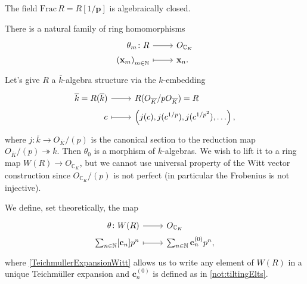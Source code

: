 \begin{thm}
	The field $\mathrm{Frac}\, R = R[1/\mathbf{p}]$ is algebraically closed.
\end{thm}


\begin{rem}[]
	There is a natural family of ring homomorphisms
	\begin{equation*}
	\begin{tikzcd}[row sep = 0ex
		,/tikz/column 1/.append style={anchor=base east}
		,/tikz/column 2/.append style={anchor=base west}]
		\theta_m\colon R \arrow[r, "", rightarrow] &
		O_{\mathbb{C}_K} \\
		\left( \mathbf{x}_m \right)_{m \in \mathbb{N}} \arrow[r, "", mapsto] & 
		\mathbf{x}_n
	.\end{tikzcd}
	\end{equation*} 
	Let's give $R$ a $\overline{k}$-algebra structure
	via the $k$-embedding
	\begin{equation*}
	\begin{tikzcd}[row sep = 0ex
		,/tikz/column 1/.append style={anchor=base east}
		,/tikz/column 2/.append style={anchor=base west}]
		\overline{k} = R(\overline{k}) \arrow[r, "", rightarrow] &
		R(O_{\overline{K}}/pO_{\overline{K}}) =R\\
		c \arrow[r, "", mapsto] & 
		\left( j(c), j(c^{1/p}), j(c^{1/p^2}), \ldots \right)
	,\end{tikzcd}
	\end{equation*} 
	where $j\colon \overline{k} \to O_{\overline{K}}/ (p)$ is the canonical
	section to the reduction map $O_{\overline{K}}/ (p) \twoheadrightarrow \overline{k}$.
	Then $\theta_0$ is a morphism of $\overline{k}$-algebras.
	We wish to lift it to a ring map $W(R) \to O_{\mathbb{C}_K}$,
	but we cannot use universal property of the Witt vector construction
	since $O_{\mathbb{C}_K}/ (p)$ is not perfect (in particular the Frobenius
	is not injective).
\end{rem}


\begin{defn}[]
	We define, set theoretically, the map
	\begin{equation*}
	\begin{tikzcd}[row sep = 0ex
		,/tikz/column 1/.append style={anchor=base east}
		,/tikz/column 2/.append style={anchor=base west}]
		\theta\colon W(R) \arrow[r, "", rightarrow] &
		O_{\mathbb{C}_K} \\
		\sum_{n \in \mathbb{N} }^{  } [\mathbf{c}_n] p^n \arrow[r, "", mapsto] & 
		\sum_{n \in \mathbb{N} }^{  } \mathbf{c}_n^{(0)} p^n
	,\end{tikzcd}
	\end{equation*} 
	where \cref{TeichmullerExpansionWitt} allows us to write any element of $W(R)$
	in a unique Teichmüller expansion and $\mathbf{c}_n^{(0)}$ is defined as in \cref{not:tiltingElts}.
\end{defn}


